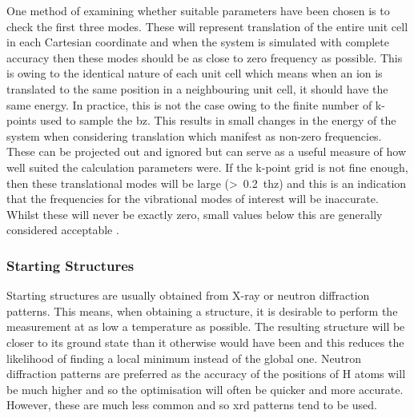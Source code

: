One method of examining whether suitable parameters have been chosen is to check the first three modes. These will represent translation of the entire unit cell in each Cartesian coordinate and when the system is simulated with complete accuracy then these modes should be as close to zero frequency as possible. This is owing to the identical nature of each unit cell which means when an ion is translated to the same position in a neighbouring unit cell, it should have the same energy. In practice, this is not the case owing to the finite number of k\nobreakdash-points used to sample the \acrshort{bz}. This results in small changes in the energy of the system when considering translation which manifest as non\nobreakdash-zero frequencies. These can be projected out \cite{Louck1976} and ignored but can serve as a useful measure of how well suited the calculation parameters were. If the k\nobreakdash-point grid is not fine enough, then these translational modes will be large (>~\SI{0.2}{\acrshort{thz}}) and this is an indication that the frequencies for the vibrational modes of interest will be inaccurate. Whilst these will never be exactly zero, small values below this are generally considered acceptable \cite{Kendrick2020}.

\subsubsection{Starting Structures}
Starting structures are usually obtained from X-ray or neutron diffraction patterns. This means, when obtaining a structure, it is desirable to perform the measurement at as low a temperature as possible. The resulting structure will be closer to its ground state than it otherwise would have been and this reduces the likelihood of finding a local minimum instead of the global one. Neutron diffraction patterns are preferred as the accuracy of the positions of H atoms will be much higher and so the optimisation will often be quicker and more accurate. However, these are much less common and so \acrfull{xrd} patterns tend to be used. 

